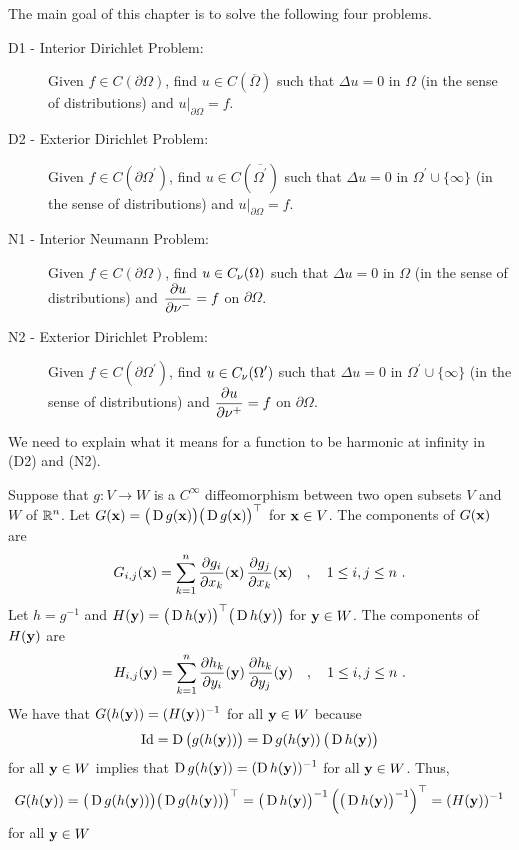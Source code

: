 The main goal of this chapter is to solve the following four problems.
\begin{description}
\item[D1 - Interior Dirichlet Problem:] Given
$f\in C(\partial \Omega)$, find $u \in C(\overline{\Omega})$ 
such that $\Delta u = 0$ in $\Omega$ (in the sense of distributions)
and $\displaystyle u\big|_{\partial \Omega} = f$.
\item[D2 - Exterior Dirichlet Problem:] Given
$\displaystyle f\in C(\partial \Omega^{\prime})$, find
$\displaystyle u \in C(\overline{\Omega^{\prime}})$
such that $\Delta u = 0$ in
$\displaystyle \Omega^{\prime} \cup \{\infty\}$ (in the sense of
distributions) and $\displaystyle u\big|_{\partial \Omega} = f$.
\item[N1 - Interior Neumann Problem:] Given
$f\in C(\partial \Omega)$, find $u \in C_{\mathbf{\nu}}(\Omega)$ 
such that $\Delta u = 0$ in $\Omega$ (in the sense of distributions)
and $\displaystyle \frac{\partial{u}}{\partial \mathbf{\nu}^-} = f$ on $\partial \Omega$.
\item[N2 - Exterior Dirichlet Problem:] Given
$\displaystyle f\in C(\partial \Omega^{\prime})$, find
$\displaystyle u \in C_{\mathbf{\nu}}(\Omega^{\prime})$
such that $\Delta u = 0$ in
$\displaystyle \Omega^{\prime} \cup \{\infty\}$ (in the sense of
distributions) and $\displaystyle \frac{\partial{u}}{\partial \mathbf{\nu}^+} = f$ on
$\partial \Omega$.
\end{description}

We need to explain what it means for a function to be harmonic at
infinity in (D2) and (N2).

Suppose that $g: V\rightarrow W$ is a $\displaystyle C^\infty$ diffeomorphism
between two open subsets $V$ and $W$ of $\displaystyle \mathbb{R}^n$.
Let $\displaystyle G(\mathbf{x}) = \big(\operatorname{D} g(\mathbf{x})\big)
\big(\operatorname{D} g(\mathbf{x})\big)^\top$ for
$\mathbf{x} \in V$.  The components of $G(\mathbf{x})$ are
\[
G_{i,j}(\mathbf{x}) = \sum_{k=1}^n \frac{\partial{g_i}}{\partial x_k}(\mathbf{x})\,
\frac{\partial{g_j}}{\partial x_k}(\mathbf{x}) \quad , \quad
1 \leq i,j \leq n \ .
\]
Let $h = g^{-1}$ and
$\displaystyle H(\mathbf{y}) = \big(\operatorname{D} h(\mathbf{y})\big)^\top
\big(\operatorname{D} h(\mathbf{y})\big)$ for $\mathbf{y} \in W$.  The components of
$H(\mathbf{y})$ are
\[
H_{i,j}(\mathbf{y}) = \sum_{k=1}^n \frac{\partial{h_k}}{\partial y_i}(\mathbf{y})\,
\frac{\partial{h_k}}{\partial y_j}(\mathbf{y}) \quad , \quad
1 \leq i,j \leq n \ .
\]
We have that
$\displaystyle G(h(\mathbf{y})) = (H(\mathbf{y}))^{-1}$ for all $\mathbf{y} \in W$
because
\[
\operatorname{Id} = \operatorname{D} \big( g(h(\mathbf{y})) \big) = \operatorname{D} g(h(\mathbf{y}))
\,\big(\operatorname{D} h(\mathbf{y}) \big)
\]
for all $\mathbf{y} \in W$ implies that
$\displaystyle \operatorname{D} g(h(\mathbf{y})) = (\operatorname{D} h(\mathbf{y}))^{-1}$
for all $\mathbf{y} \in W$.  Thus,
\[
G(h(\mathbf{y})) = \big(\operatorname{D} g(h(\mathbf{y}))\big)
\big(\operatorname{D} g(h(\mathbf{y}))\big)^\top
= \big(\operatorname{D} h(\mathbf{y})\big)^{-1}
\left( \big(\operatorname{D} h(\mathbf{y}) \big)^{-1}\right)^\top
= (H(\mathbf{y}))^{-1}
\]
for all $\mathbf{y} \in W$


